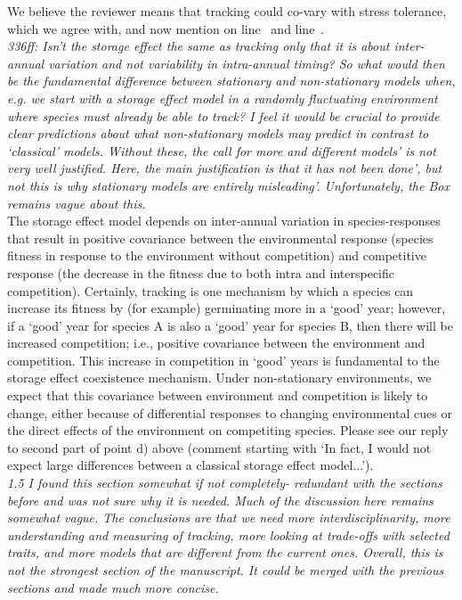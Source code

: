 \documentclass[11pt,letterpaper]{article}
\newcommand{\lr}[1]{line~\lineref{#1}}
\begin{document}
We believe the reviewer means that tracking could co-vary with stress tolerance, which we agree with, and now mention on \lr{r1stress} and \lr{stressagain}.\\

\emph{336ff: Isn't the storage effect the same as tracking only that it is about inter-annual
variation and not variability in intra-annual timing? So what would then be the fundamental
difference between stationary and non-stationary models when, e.g. we start with a storage
effect model in a randomly fluctuating environment where species must already be able to
track? I feel it would be crucial to provide clear predictions about what non-stationary
models may predict in contrast to  `classical' models. Without these, the call for more and
different models' is not very well justified. Here, the main justification is that it has
not been done', but not this is why stationary models are entirely misleading'.
Unfortunately, the Box remains vague about this.}\\

The storage effect model depends on inter-annual variation in species-responses that result in positive covariance between the environmental response (species fitness in response to the environment without competition) and competitive response (the decrease in the fitness due to both intra and interspecific competition).  Certainly, tracking is one mechanism by which a species can increase its fitness by (for example) germinating more in a `good' year; however, if a `good' year for species A is also a `good' year for species B, then there will be increased competition; i.e., positive covariance between the environment and competition.  This increase in competition in `good' years is fundamental to the storage effect coexistence mechanism.  Under non-stationary environments, we expect that this covariance between environment and competition is likely to change, either because of differential responses to changing environmental cues or the direct effects of the environment on competiting species.   Please see our reply to second part of point d) above (comment starting with `In fact, I would not expect large differences between a classical storage effect model...').\\

\emph{1.5 I found this section somewhat if not completely- redundant with the sections before and
was not sure why it is needed. Much of the discussion here remains somewhat vague. The
conclusions are that we need more interdisciplinarity, more understanding and measuring of
tracking, more looking at trade-offs with selected traits, and more models that are different
from the current ones. Overall, this is not the strongest section of the manuscript. It could
be merged with the previous sections and made much more concise.}\\
\end{document}
